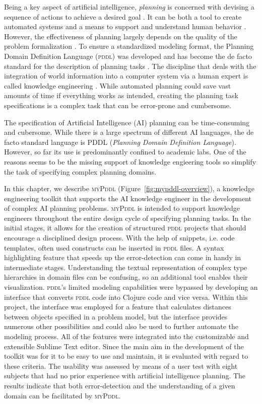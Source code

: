 \documentclass[runningheads]{llncs}
\newcommand{\mypddl}{\textsc{myPddl}\xspace}
\newcommand{\pddl}{\textsc{pddl}\xspace}
\begin{document}
Being a key aspect of artificial intelligence, \emph{planning} is
concerned with devising a sequence of actions to achieve a desired
goal \cite{helmert2008understanding}. It can be both a tool to create
automated systems and a means to support and understand human behavior
\cite{konar1999artificial}. However, the effectiveness of planning
largely depends on the quality of the problem formalization
\cite{shah2013knowledge,keps2014}. To ensure a standardized modeling
format, the Planning Domain Definition Language (\textsc{pddl})
\cite{mcdermott1998pddl} was developed and has become the de facto
standard for the description of planning tasks
\cite{ilghami2005extension}. The discipline that deals with the
integration of world information into a computer system via a human
expert is called knowledge engineering \cite{feigenbaum1983fifth}.
While automated planning could save vast amounts of time if everything
works as intended, creating the planning task specifications is a
complex task that can be error-prone and cumbersome.

The specification of Artificial Intelligence (AI) planning can be
time-consuming and cubersome. While there is a large spectrum of
different AI languages, the de facto standard language is PDDL
(\emph{Planning Domain Definition Language}). However, so far its use
is predominantly confined to academic labs. One of the reasons seems
to be the missing support of knowledge engieering tools so simplify
the task of specifying complex planning domains. 

In this chapter, we describe \mypddl
(Figure~\ref{fig:mypddl-overview}), a knowledge engineering toolkit
that supports the AI knowledge engineer in the development of complex
AI planning problems. \mypddl is intended to support knowledge
engineers throughout the entire design cycle of specifying planning
tasks. In the initial stages, it allows for the creation of structured
\textsc{pddl} projects that should encourage a disciplined design
process. With the help of snippets, i.e. code templates, often used
constructs can be inserted in \textsc{pddl} files. A syntax
highlighting feature that speeds up the error-detection can come in
handy in intermediate stages. Understanding the textual representation
of complex type hierarchies in domain files can be confusing, so an
additional tool enables their visualization. \textsc{pddl}'s limited
modeling capabilities were bypassed by developing an interface that
converts \pddl code into Clojure \cite{hickey2008clojure} code and
vice versa.  Within this project, the interface was employed for a
feature that calculates distances between objects specified in a
problem model, but the interface provides numerous other possibilities
and could also be used to further automate the modeling process. All
of the features were integrated into the customizable and extensible
Sublime Text \cite{sublimetext3} editor. Since the main aim in the
development of the toolkit was for it to be easy to use and maintain,
it is evaluated with regard to these criteria. The usability was
assessed by means of a user test with eight subjects that had no prior
experience with artificial intelligence planning. The results indicate
that both error-detection and the understanding of a given domain can
be facilitated by \mypddl.
\end{document}

